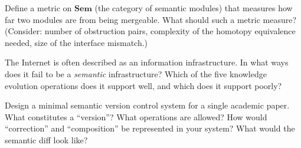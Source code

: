 \begin{exercise}
  Define a metric on $\mathbf{Sem}$ (the category of semantic modules)
  that measures how far two modules are from being mergeable. What
  should such a metric measure? (Consider: number of obstruction pairs,
  complexity of the homotopy equivalence needed, size of the interface
  mismatch.)
\end{exercise}

\begin{exercise}
  The Internet is often described as an information infrastructure.
  In what ways does it fail to be a \emph{semantic} infrastructure?
  Which of the five knowledge evolution operations does it support
  well, and which does it support poorly?
\end{exercise}

\begin{exercise}[title={Constructive}]
  Design a minimal semantic version control system for a single academic
  paper. What constitutes a ``version''? What operations are allowed?
  How would ``correction'' and ``composition'' be represented in
  your system? What would the semantic diff look like?
\end{exercise}
